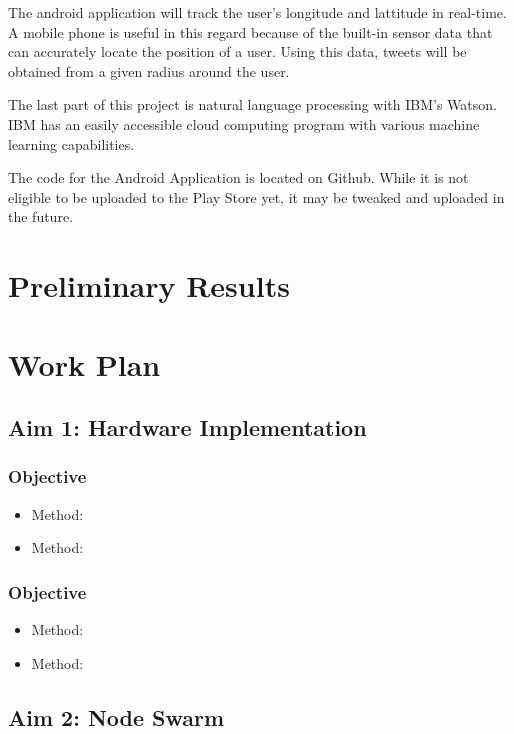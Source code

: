 \documentclass[12pt, oneside]{article}
\begin{document}
The android application will track the user's longitude and lattitude in real-time. A mobile phone is useful in this regard because of the built-in sensor data that can accurately locate the position of a user. Using this data, tweets will be obtained from a given radius around the user.

The last part of this project is natural language processing with IBM's Watson.
IBM has an easily accessible cloud computing program with various machine learning capabilities\cite{IBM}.

The code for the Android Application is located on Github. While it is not
eligible to be uploaded to the Play Store yet, it may be tweaked and uploaded
in the future\cite{Git}.

\section{Preliminary Results}

\section{Work Plan}


\subsection{Aim 1: Hardware Implementation}

\subsubsection{Objective}

\begin{itemize}
 \item Method:
 \item Method:
\end{itemize}

\subsubsection{Objective}

\begin{itemize}
 \item Method:
 \item Method:
\end{itemize}

\subsection{Aim 2: Node Swarm}
\end{document}
